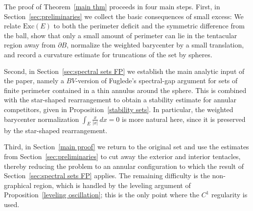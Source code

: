 \documentclass[reqno,11pt]{amsart}
\newcommand{\R}{\mathbb R}
\newtheorem{thm}{Theorem}[section]
\numberwithin{equation}{section}
\theoremstyle{remark}
\begin{document}
%

%
%



The proof of Theorem~\ref{main thm} proceeds in four main steps. First, in Section~\ref{sec:preliminaries} we collect the basic consequences of small excess: We relate $\mathrm{Exc}(E)$ to both the perimeter deficit and the symmetric difference from the ball, show that only a small amount of perimeter can lie in the tentacular region away from $\partial B$, normalize the weighted barycenter by a small translation, and record a curvature estimate for truncations of the set by spheres. 

Second, in Section~\ref{sec:spectral sets FP} we establish the main analytic input of the paper, namely a $BV$-version of Fuglede's spectral-gap argument for sets of finite perimeter contained in a thin annulus around the sphere. This is combined with the star-shaped rearrangement to obtain a stability estimate for annular competitors, given in Proposition~\ref{stability sets}. In particular, the weighted  barycenter normalization $\int_E  \frac{x}{|x|}\,dx=0$ is more natural here, since it is preserved by the star-shaped rearrangement. 

Third, in Section~\ref{main proof} we return to the original set and use the estimates from Section~\ref{sec:preliminaries} to cut away the exterior and interior tentacles, thereby reducing the problem to an annular configuration to which the result of Section~\ref{sec:spectral sets FP} applies. The remaining difficulty is the non-graphical region, which is handled by the leveling argument of Proposition~\ref{leveling oscillation}; this is the only point where the $C^1$ regularity is used. 
\end{document}
